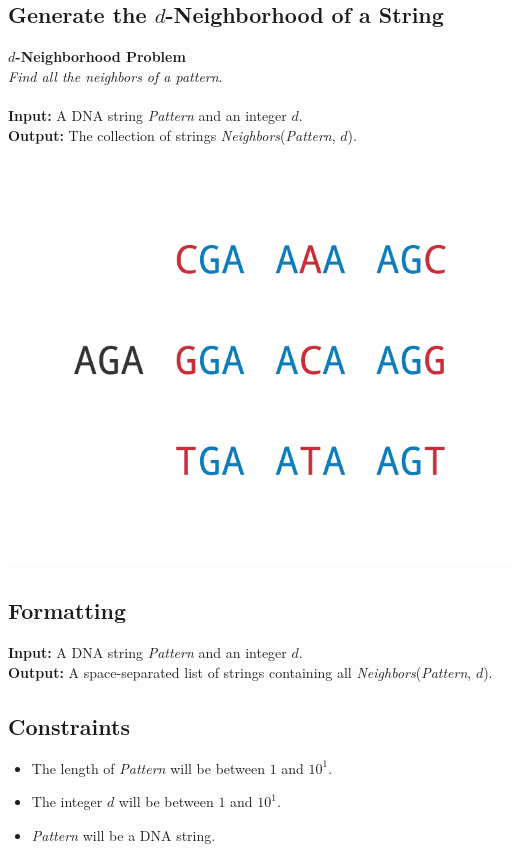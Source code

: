 \documentclass{article}
\begin{document}
\subsection{Generate the $d$-Neighborhood of a String}
\hline\vspace{5}
\noindent \textbf{$d$-Neighborhood Problem}\\
\emph{Find all the neighbors of a pattern}.\\ \\
\textbf{Input:} A DNA string \emph{Pattern} and an integer $d$.\\
\textbf{Output:} The collection of strings \emph{Neighbors}(\emph{Pattern}, $d$).
\begin{center}
    \includegraphics[scale=0.24]{c1/logos/1N.png} 
\end{center}
\hline\vspace{5}

\subsection*{Formatting}
\textbf{Input:} A DNA string \emph{Pattern} and an integer $d$.\\
\noindent \textbf{Output:} A space-separated list of strings containing all \emph{Neighbors}(\emph{Pattern}, $d$).

\subsection*{Constraints}
\begin{itemize}
    \item The length of \emph{Pattern} will be between $1$ and $10^1$.
    \item The integer $d$ will be between $1$ and $10^1$.
    \item \emph{Pattern} will be a DNA string.
\end{itemize}
\pagebreak
\end{document}
